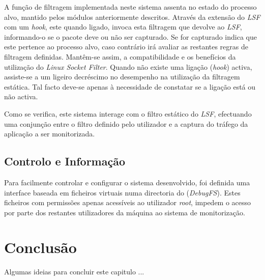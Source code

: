 A função de filtragem implementada neste sistema assenta no estado do processo alvo, mantido pelos módulos anteriormente descritos.
Através da extensão do \textit{LSF} com um \textit{hook}, este quando ligado, invoca esta filtragem que devolve ao \textit{LSF}, informando-o se o pacote deve ou não ser capturado.
Se for capturado indica que este pertence ao processo alvo, caso contrário irá avaliar as restantes regras de filtragem definidas.
Mantêm-se assim, a compatibilidade e os benefícios da utilização do \textit{Linux Socket Filter}.
Quando não existe uma ligação (\textit{hook}) activa, assiste-se a um ligeiro decréscimo no desempenho na utilização da filtragem estática.
Tal facto deve-se apenas à necessidade de constatar se a ligação está ou não activa.

Como se verifica, este sistema interage com o filtro estático do \textit{LSF}, efectuando uma conjunção entre o filtro definido pelo utilizador e a captura do tráfego da aplicação a ser monitorizada.

\subsection{Controlo e Informação}
\label{sub:data_information}

Para facilmente controlar e configurar o sistema desenvolvido, foi definida uma interface baseada em ficheiros virtuais numa directoria do (\textit{DebugFS}).
Estes ficheiros com permissões apenas acessíveis ao utilizador \textit{root}, impedem o acesso por parte dos restantes utilizadores da máquina ao sistema de monitorização.

\section{Conclusão}

Algumas ideias para concluir este capitulo ...

